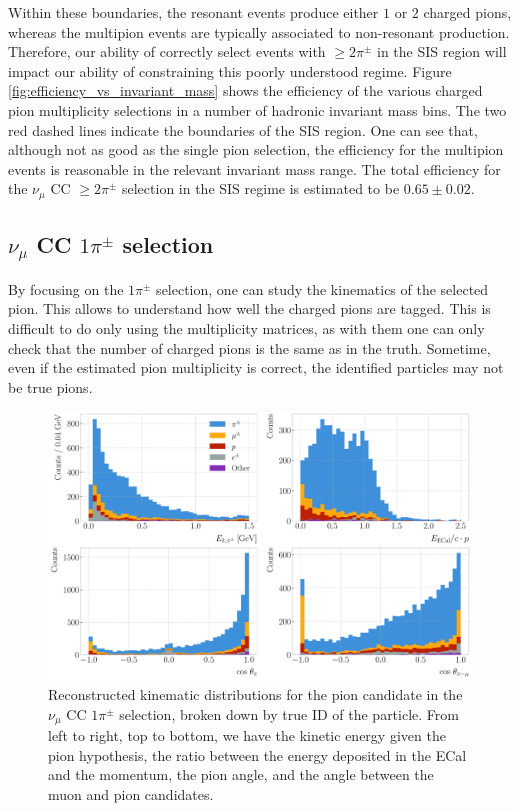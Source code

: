 Within these boundaries, the resonant events produce either $1$ or $2$ charged pions, whereas the multipion events are typically associated to non-resonant production. Therefore, our ability of correctly select events with $\geq 2\pi^{\pm}$ in the SIS region will impact our ability of constraining this poorly understood regime. Figure \ref{fig:efficiency_vs_invariant_mass} shows the efficiency of the various charged pion multiplicity selections in a number of hadronic invariant mass bins. The two red dashed lines indicate the boundaries of the SIS region. One can see that, although not as good as the single pion selection, the efficiency for the multipion events is reasonable in the relevant invariant mass range. The total efficiency for the $\nu_{\mu}$ CC $\geq 2\pi^{\pm}$ selection in the SIS regime is estimated to be $0.65 \pm 0.02$.

\subsection[\texorpdfstring{$\nu_{\mu}$}{numu} CC \texorpdfstring{$1\pi^{\pm}$}{1pi} selection]{\boldmath\texorpdfstring{$\nu_{\mu}$}{numu} CC \boldmath\texorpdfstring{$1\pi^{\pm}$}{1pi} selection}

By focusing on the $1\pi^{\pm}$ selection, one can study the kinematics of the selected pion. This allows to understand how well the charged pions are tagged. This is difficult to do only using the multiplicity matrices, as with them one can only check that the number of charged pions is the same as in the truth. Sometime, even if the estimated pion multiplicity is correct, the identified particles may not be true pions.

\begin{figure}[t]
    \centering
    \includegraphics[width=.99\linewidth]{Images/GAr_selection/pion_selection_1pion_kinematics.pdf}
    \caption[Reconstructed kinematic distributions for the pion candidate in the $\nu_{\mu}$ CC $1\pi^{\pm}$ selection.]{Reconstructed kinematic distributions for the pion candidate in the $\nu_{\mu}$ CC $1\pi^{\pm}$ selection, broken down by true ID of the particle. From left to right, top to bottom, we have the kinetic energy given the pion hypothesis, the ratio between the energy deposited in the ECal and the momentum, the pion angle, and the angle between the muon and pion candidates.}
    \label{fig:1pion_kinematics}
\end{figure}

